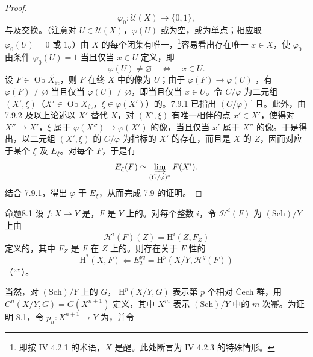 \begin{proof}
\[\varphi_0:\mathcal U(X)\longrightarrow\{0,1\},\]
与及交换。（注意对 $U\in\mathcal U(X)$，$\varphi(U)$ 或为空，或为单点；相应取 $\varphi_0(U)=0$ 或 $1$。）由 $X$ 的每个闭集有唯一，\footnote{即按 IV 4.2.1 的术语，$X$ 是醒。此处断言为 IV 4.2.3 的特殊情形。}容易看出存在唯一 $x\in X$，使 $\varphi_0$ 由条件 $\varphi_0(U)=1$ 当且仅当 $x\in U$ 定义，即
\[\varphi(U)\ne\varnothing\quad\Longleftrightarrow\quad x\in U.\]
设 $F\in\operatorname{Ob}\widetilde{X_{\text{ét}}}$，则 $F$ 在终 $X$ 中的像为 $U$；由于 $\varphi(F)\to\varphi(U)$ ，有 $\varphi(F)\ne\varnothing$ 当且仅当 $\varphi(U)\ne\varnothing$，即当且仅当 $x\in U$。令 $C/\varphi$ 为二元组 $(X',\xi)$（$X'\in\operatorname{Ob}X_{\text{ét}}$，$\xi\in\varphi(X')$）的。7.9.1 已指出 $(C/\varphi)^\circ$ 且。此外，由 7.9.2 及以上论述以 $X'$ 替代 $X$，对 $(X',\xi)$ 有唯一相伴的点 $x'\in X'$，使得对 $X''\to X'$，$\xi$ 属于 $\varphi(X'')\to\varphi(X')$ 的像，当且仅当 $x'$ 属于 $X''$ 的像。于是得出，以二元组 $(X',\xi)$ 的 $C/\varphi$ 为指标的 $X'$ 的存在，而且是 $X$ 的 $Z$，因而对应于某个 $\xi$ 及 $E_\xi$。对每个 $F$，于是有
\[E_\xi(F)\simeq\varinjlim_{(C/\varphi)^\circ}F(X').\]
结合 7.9.1，得出 $\varphi$ 于 $E_\xi$，从而完成 7.9 的证明。
\end{proof}
\begin{SGAresult}{命题}{8.1}
设 $f:X\to Y$ 是，$F$ 是 $Y$ 上的。对每个整数 $i$，令 $\mathscr H^i(F)$ 为 $(\mathrm{Sch})/Y$ 上由
\[\mathscr H^i(F)(Z)=\mathrm H^i(Z,F_Z)\]
定义的，其中 $F_Z$ 是 $F$ 在 $Z$ 上的。则存在关于 $F$ 性的
\[\mathrm H^*(X,F)\Longleftarrow E_2^{pq}=\mathrm H^p(X/Y,\mathscr H^q(F))\]
（“”）。
\end{SGAresult}
当然，对 $(\mathrm{Sch})/Y$ 上的 $G$， $\mathrm H^p(X/Y,G)$ 表示第 $p$ 个相对 Čech 群，用 $C^n(X/Y,G)=G(X^{n+1})$ 定义，其中 $X^m$ 表示 $(\mathrm{Sch})/Y$ 中的 $m$ 次幂。为证明 8.1，令 $p_n:X^{n+1}\to Y$ 为，并令
